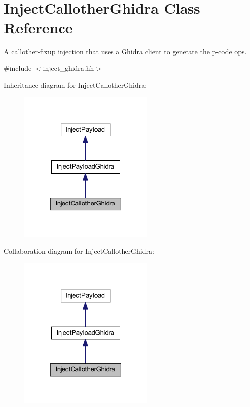 \hypertarget{class_inject_callother_ghidra}{}\section{Inject\+Callother\+Ghidra Class Reference}
\label{class_inject_callother_ghidra}


A callother-\/fixup injection that uses a Ghidra client to generate the p-\/code ops.  




{\ttfamily \#include $<$inject\+\_\+ghidra.\+hh$>$}



Inheritance diagram for Inject\+Callother\+Ghidra\+:
\nopagebreak
\begin{figure}[H]
\begin{center}
\leavevmode
\includegraphics[width=187pt]{class_inject_callother_ghidra__inherit__graph}
\end{center}
\end{figure}


Collaboration diagram for Inject\+Callother\+Ghidra\+:
\nopagebreak
\begin{figure}[H]
\begin{center}
\leavevmode
\includegraphics[width=187pt]{class_inject_callother_ghidra__coll__graph}
\end{center}
\end{figure}
